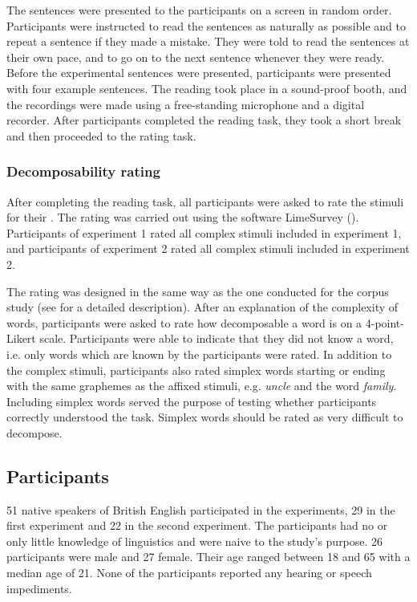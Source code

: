 The sentences were presented to the participants on a screen in random order. 
Participants were instructed to read the sentences as naturally as possible and to repeat a sentence if they made a mistake. They were told to read the sentences at their own pace, and to go on to the next sentence whenever they were ready. Before the experimental sentences were presented, participants were presented with four example sentences. 
The reading took place in a sound-proof booth, and the recordings were made using a free-standing microphone and a digital recorder.
 After participants completed the reading task, they took a short break and then proceeded to the rating task.




\subsubsection{Decomposability rating}\label{sec:decomprating}


After completing the reading task, all participants were asked to rate the stimuli for their . The rating was carried out using the software LimeSurvey (\citealt{LimeSurveyProjectTeam.2015}). Participants of experiment 1 rated all complex stimuli included in experiment 1, and participants of experiment 2 rated all complex stimuli included in experiment 2. 

The rating was designed in the same way as the one conducted for the corpus study (see  for a detailed description). After an explanation of the complexity of words, participants were asked to rate how decomposable a word is on a 4-point-Likert scale. Participants were able to indicate that they did not know a word, i.e. only words which are known by the participants were rated. In addition to the complex stimuli, participants also rated simplex words starting or ending with the same graphemes as the affixed stimuli, e.g. \textit{{un}cle} and the word \textit{fami{ly}}. Including simplex words served the purpose of testing whether participants correctly understood the task. Simplex words should be rated as very difficult to decompose. 

\subsection{Participants}
51 native speakers of British English participated in the experiments, 29 in the first experiment and 22 in the second experiment. The participants had no or only little knowledge of linguistics and were naive to the study's purpose. 26 participants were male and 27 female. Their age ranged between 18 and 65 with a median age of 21. None of the participants reported any hearing or speech impediments.

